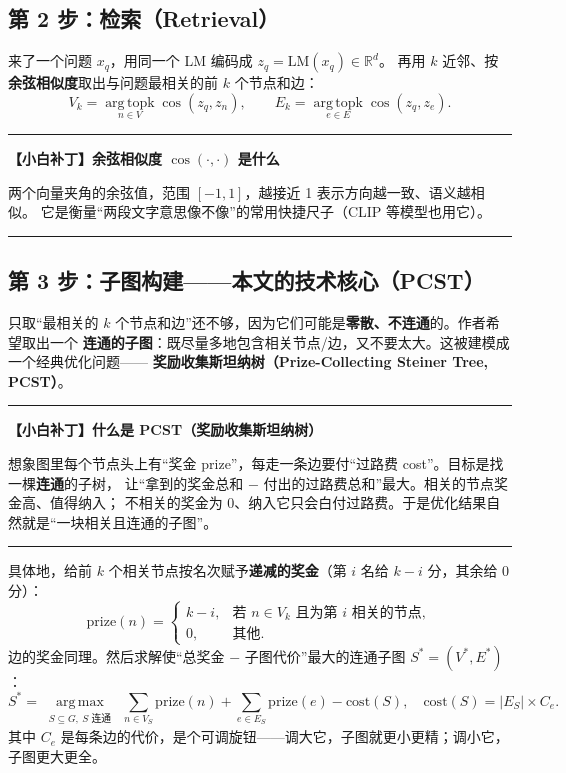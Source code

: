 \documentclass[11pt,UTF8,fontset=fandol]{ctexart}
\newenvironment{tip}[1]{%
  \par\smallskip\noindent\rule{\linewidth}{0.4pt}\par\nobreak
  \noindent\textbf{【小白补丁】#1}\par\nobreak\noindent\ignorespaces
}{%
  \par\noindent\rule{\linewidth}{0.4pt}\par\smallskip
}
\begin{document}
\subsection{第 2 步：检索（Retrieval）}
来了一个问题 $x_q$，用同一个 LM 编码成 $z_q=\mathrm{LM}(x_q)\in\mathbb{R}^{d}$。
再用 $k$ 近邻、按\textbf{余弦相似度}取出与问题最相关的前 $k$ 个节点和边：
\begin{equation*}
  V_k = \operatorname*{arg\,topk}_{n\in V}\cos(z_q,z_n),\qquad
  E_k = \operatorname*{arg\,topk}_{e\in E}\cos(z_q,z_e). \tag{2}
\end{equation*}
\begin{tip}{余弦相似度 $\cos(\cdot,\cdot)$ 是什么}
两个向量夹角的余弦值，范围 $[-1,1]$，越接近 1 表示方向越一致、语义越相似。
它是衡量“两段文字意思像不像”的常用快捷尺子（CLIP 等模型也用它）。
\end{tip}

\subsection{第 3 步：子图构建——本文的技术核心（PCST）}
只取“最相关的 $k$ 个节点和边”还不够，因为它们可能是\textbf{零散、不连通}的。作者希望取出一个
\textbf{连通的子图}：既尽量多地包含相关节点/边，又不要太大。这被建模成一个经典优化问题——
\textbf{奖励收集斯坦纳树（Prize-Collecting Steiner Tree, PCST）}。

\begin{tip}{什么是 PCST（奖励收集斯坦纳树）}
想象图里每个节点头上有“奖金 prize”，每走一条边要付“过路费 cost”。目标是找一棵\textbf{连通}的子树，
让“拿到的奖金总和 $-$ 付出的过路费总和”最大。相关的节点奖金高、值得纳入；
不相关的奖金为 0、纳入它只会白付过路费。于是优化结果自然就是“一块相关且连通的子图”。
\end{tip}

具体地，给前 $k$ 个相关节点按名次赋予\textbf{递减的奖金}（第 $i$ 名给 $k-i$ 分，其余给 0 分）：
\begin{equation*}
  \mathrm{prize}(n)=
  \begin{cases}
    k-i, & \text{若 } n\in V_k \text{ 且为第 } i \text{ 相关的节点},\\
    0, & \text{其他}.
  \end{cases}\tag{3}
\end{equation*}
边的奖金同理。然后求解使“总奖金 $-$ 子图代价”最大的连通子图 $S^\ast=(V^\ast,E^\ast)$：
\begin{equation*}
  S^\ast=\operatorname*{arg\,max}_{\substack{S\subseteq G,\ S\text{ 连通}}}
  \ \sum_{n\in V_S}\mathrm{prize}(n)+\sum_{e\in E_S}\mathrm{prize}(e)-\mathrm{cost}(S),
  \quad \mathrm{cost}(S)=|E_S|\times C_e. \tag{4}
\end{equation*}
其中 $C_e$ 是每条边的代价，是个可调旋钮——调大它，子图就更小更精；调小它，子图更大更全。
\end{document}
